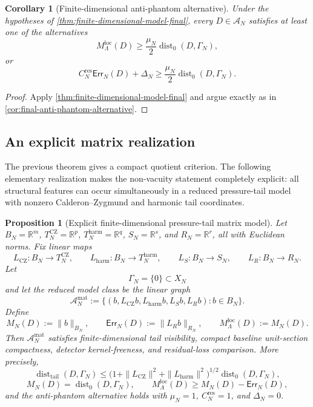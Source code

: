 \documentclass[11pt]{article}
\numberwithin{equation}{section}
\newtheorem{proposition}[proposition]{Proposition}
\newtheorem{corollary}[corollary]{Corollary}
\theoremstyle{definition}
\theoremstyle{remark}
\newcommand{\loc}{\mathrm{loc}}
\newcommand{\tail}{\mathrm{tail}}
\newcommand{\harm}{\mathrm{harm}}
\newcommand{\CZ}{\mathrm{CZ}}
\newcommand{\res}{\mathrm{res}}
\newcommand{\Err}{\mathsf{Err}}
\newcommand{\Dist}{\operatorname{dist}}
\newcommand{\calA}{\mathcal A}
\begin{document}
\begin{corollary}[Finite-dimensional anti-phantom alternative]\label{cor:finite-model-anti-phantom-final}
Under the hypotheses of \cref{thm:finite-dimensional-model-final}, every \(D\in\calA_N\) satisfies at least one of the alternatives
\[
        M_\Lambda^{\loc}(D)
        \ge
        \frac{\mu_N}{2}\Dist_0(D,\Gamma_N),
\]
or
\[
        C_N^{\res}\Err_N(D)+\Delta_N
        \ge
        \frac{\mu_N}{2}\Dist_0(D,\Gamma_N).
\]
\end{corollary}

\begin{proof}
Apply \cref{thm:finite-dimensional-model-final} and argue exactly as in \cref{cor:final-anti-phantom-alternative}.
\end{proof}


\subsection*{An explicit matrix realization}

The previous theorem gives a compact quotient criterion.  The following elementary realization makes the non-vacuity statement completely explicit: all structural features can occur simultaneously in a reduced pressure-tail model with nonzero Calderon--Zygmund and harmonic tail coordinates.

\begin{proposition}[Explicit finite-dimensional pressure-tail matrix model]\label{prop:explicit-matrix-tail-model}
Let \(B_N=\mathbb R^m\), \(T_N^{\CZ}=\mathbb R^{p}\), \(T_N^{\harm}=\mathbb R^{q}\), \(S_N=\mathbb R^s\), and \(R_N=\mathbb R^r\), all with Euclidean norms.  Fix linear maps
\[
        L_{\CZ}:B_N\to T_N^{\CZ},\qquad
        L_{\harm}:B_N\to T_N^{\harm},\qquad
        L_{S}:B_N\to S_N,
        \qquad
        L_R:B_N\to R_N.
\]
Let
\[
        \Gamma_N=\{0\}\subset X_N
\]
and let the reduced model class be the linear graph
\[
        \calA_N^{\mathrm{mat}}
        :=
        \{(b,L_{\CZ}b,L_{\harm}b,L_Sb,L_Rb): b\in B_N\}.
\]
Define
\[
        M_N(D):=\|b\|_{B_N},
        \qquad
        \Err_N(D):=\|L_Rb\|_{R_N},
        \qquad
        M_\Lambda^{\loc}(D):=M_N(D).
\]
Then \(\calA_N^{\mathrm{mat}}\) satisfies finite-dimensional tail visibility, compact baseline unit-section compactness, detector kernel-freeness, and residual-loss comparison.  More precisely,
\[
        \Dist_{\tail}(D,\Gamma_N)
        \le
        \bigl(1+\|L_{\CZ}\|^2+\|L_{\harm}\|^2\bigr)^{1/2}
        \Dist_0(D,\Gamma_N),
\]
\[
        M_N(D)=\Dist_0(D,\Gamma_N),
        \qquad
        M_\Lambda^{\loc}(D)
        \ge
        M_N(D)-\Err_N(D),
\]
and the anti-phantom alternative holds with \(\mu_N=1\), \(C_N^{\res}=1\), and \(\Delta_N=0\).
\end{proposition}
\end{document}
